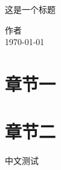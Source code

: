 \documentclass[11pt]{ctexart}
\begin{document}
\begin{titlepage}
\centering
\begin{Huge}
	这是一个标题\par
\end{Huge}
\vspace{10cm}
\begin{Large}
	作者\\ 
	\vspace{1cm}
	\today
\end{Large}
\end{titlepage}
\tableofcontents
\thispagestyle{empty}
\newpage
\setcounter{page}{1}
\section{章节一}
\blindtext
\section{章节二}
中文测试
\end{document}
